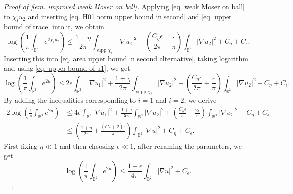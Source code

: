 \documentclass[10pt,a4paper]{amsart}
\begin{document}
\begin{proof}[Proof of \cref{lem. improved weak Moser on ball}]
        Applying \cref{eq. weak Moser on ball} to $\chi_i u_2$ and inserting \cref{eq. H01 norm upper bound in second} and \cref{eq. upper bound of trace} into it, we obtain
        \[
        \log\left(
        \frac{1}{\pi}
        \int_{\mathbb{B}^2}e^{2\chi_i u_2}
        \right)
        \leq 
        \frac{1+\eta}{2\pi}
        \int_{\operatorname{supp}\chi_i}|\nabla u_2|^2
        +\left(\frac{C_\eta\epsilon}{2\pi}
        +\frac{\epsilon}{\pi}
        \right)
        \int_{\mathbb{B}^2}|\nabla u_2|^2
            +C_\eta+C_\epsilon.
        \]
        Inserting this into \cref{eq. area upper bound in second alternative}, taking logarithm and using \cref{eq. upper bound of u1}, we get 
        \[
        \log\left(
        \frac{1}{\pi}
        \int_{\mathbb{B}^2}e^{2u}
        \right)
        \leq
        2\epsilon\int_{\mathbb{B}^2}
        |\nabla u_1|^2
        +\frac{1+\eta}{2\pi}
        \int_{\operatorname{supp}\chi_i}|\nabla u_2|^2
        +\left(\frac{C_\eta\epsilon}{2\pi}
        +\frac{\epsilon}{\pi}
        \right)
        \int_{\mathbb{B}^2}|\nabla u_2|^2
        +C_\eta+C_\epsilon.
        \]
        By adding the inequalities corresponding to $i=1$ and $i=2$, we derive
        \begin{align*}
            2\log\left(
        \frac{1}{\pi}
        \int_{\mathbb{B}^2}e^{2u}
        \right)
        &\leq
        4\epsilon\int_{\mathbb{B}^2}
        |\nabla u_1|^2
        +\frac{1+\eta}{2\pi}
        \int_{\mathbb{B}^2}|\nabla u_2|^2
        +\left(\frac{C_\eta\epsilon}{\pi}
        +\frac{2\epsilon}{\pi}
        \right)
        \int_{\mathbb{B}^2}|\nabla u_2|^2
        +C_\eta+C_\epsilon\\[3mm]
        &\leq 
        \left(
        \frac{1+\eta}{2\pi}
        +\frac{(C_\eta+2)\epsilon}{\pi}
        \right)
        \int_{\mathbb{B}^2}|\nabla u|^2
        +C_\eta+C_\epsilon.
        \end{align*}
        First fixing $\eta\ll 1$ and then choosing $\epsilon\ll 1$, after renaming the parameters, we get
        \[
        \log\left(
        \frac{1}{\pi}
        \int_{\mathbb{B}^2}e^{2u}
        \right)
        \leq \frac{1+\epsilon}{4\pi}
        \int_{\mathbb{B}^2}|\nabla u|^2
        +C_\epsilon.
        \] 


\end{proof}
\end{document}
